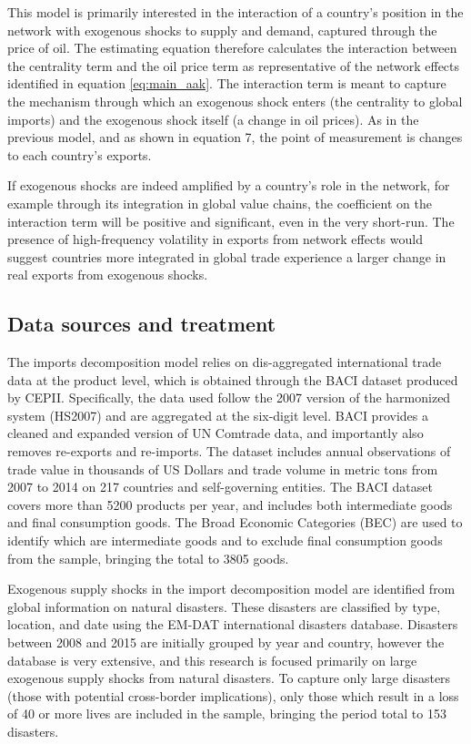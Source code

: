 \documentclass[10pt,letterpaper,pdftex]{article}
\begin{document}
This model is primarily interested in the interaction of a country's position in the network with exogenous shocks to supply and demand, captured through the price of oil. The estimating equation therefore calculates the interaction between the centrality term and the oil price term as representative of the network effects identified in equation \ref{eq:main_aak}. The interaction term is meant to capture the mechanism through which an exogenous shock enters (the centrality to global imports) and the exogenous shock itself (a change in oil prices). As in the previous model, and as shown in equation 7, the point of measurement is changes to each country's exports. 

If exogenous shocks are indeed amplified by a country's role in the network, for example through its integration in global value chains, the coefficient on the interaction term will be positive and significant, even in the very short-run. The presence of high-frequency volatility in exports from network effects would suggest countries more integrated in global trade experience a larger change in real exports from exogenous shocks.

\subsection{Data sources and treatment} \label{data_sources}
The imports decomposition model relies on dis-aggregated international trade data at the product level, which is obtained through the BACI dataset produced by CEPII. Specifically, the data used follow the 2007 version of the harmonized system (HS2007) and are aggregated at the six-digit level. BACI provides a cleaned and expanded version of UN Comtrade data, and importantly also removes re-exports and re-imports. The dataset includes annual observations of trade value in thousands of US Dollars and trade volume in metric tons from 2007 to 2014 on 217 countries and self-governing entities. The BACI dataset covers more than 5200 products per year, and includes both intermediate goods and final consumption goods. The Broad Economic Categories (BEC) are used to identify which are intermediate goods and to exclude final consumption goods from the sample, bringing the total to 3805 goods. 

Exogenous supply shocks in the import decomposition model are identified from global information on natural disasters. These disasters are classified by type, location, and date using the EM-DAT international disasters database. Disasters between 2008 and 2015 are initially grouped by year and country, however the database is very extensive, and this research is focused primarily on large exogenous supply shocks from natural disasters. To capture only large disasters (those with potential cross-border implications), only those which result in a loss of 40 or more lives are included in the sample, bringing the period total to 153 disasters.
\end{document}
